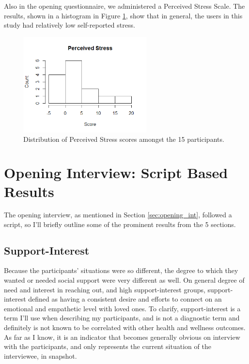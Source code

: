   Also in the opening questionnaire, we administered a Perceived Stress Scale.
  The results, shown in a histogram in Figure \ref{fig:perceived_stress},
  show that in general, the users in this study had relatively low
  self-reported stress.

    \begin{figure}
    \centering
    \includegraphics[width=0.6\textwidth]{perceived_stress.png}
    \caption{
      Distribution of Perceived Stress scores amongst the 15 participants.
    }
    \label{fig:perceived_stress}
    \end{figure}

\section{Opening Interview: Script Based Results}
  The opening interview, as mentioned in Section \ref{sec:opening_int},
  followed a script, so I'll briefly outline some of the
  prominent results from the 5 sections.

  \subsection{Support-Interest}
  Because the participants' situations were so different,
  the degree to which they wanted or needed social support were very different as well.
  On general degree of need and interest in reaching out,
  and high support-interest groups,
  support-interest defined as having a consistent desire and efforts to
  connect on an emotional and empathetic level with loved ones.
  To clarify, support-interest is a term I'll use when describing my participants,
  and is not a diagnostic term and definitely is not known to be
  correlated with other health and wellness outcomes.
  As far as I know, it is an indicator that becomes generally obvious
  on interview with the participants,
  and only represents the current situation of the interviewee, in snapshot.

